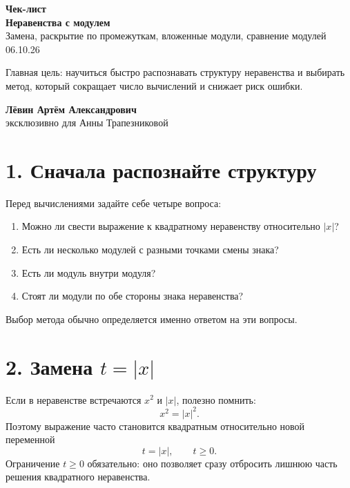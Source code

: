 \documentclass[a4paper,12pt]{article}
\newcommand{\sectionline}{\par\vspace{0.25em}{\color{accent}\hrule height 0.7pt}\vspace{0.7em}}
\begin{document}
\begin{titlepage}
\thispagestyle{empty}
\centering
\vspace*{26mm}
{\Large\color{darkaccent}\textbf{Чек-лист}}\\[8mm]
{\Huge\bfseries Неравенства с модулем}\\[5mm]
{\large Замена, раскрытие по промежуткам, вложенные модули, сравнение модулей}\\[18mm]
{\large 06.10.26}\\[24mm]
\begin{minipage}{0.78\textwidth}
\centering
\large
Главная цель: научиться быстро распознавать структуру неравенства и выбирать метод, который сокращает число вычислений и снижает риск ошибки.
\end{minipage}
\vfill
{\large\textbf{Лёвин Артём Александрович}}\\[2mm]
{\large эксклюзивно для Анны Трапезниковой}
\vspace{15mm}

\end{titlepage}

\section*{1. Сначала распознайте структуру}
\sectionline
Перед вычислениями задайте себе четыре вопроса:
\begin{enumerate}
  \item Можно ли свести выражение к квадратному неравенству относительно $|x|$?
  \item Есть ли несколько модулей с разными точками смены знака?
  \item Есть ли модуль внутри модуля?
  \item Стоят ли модули по обе стороны знака неравенства?
\end{enumerate}

Выбор метода обычно определяется именно ответом на эти вопросы.

\section*{2. Замена $t=|x|$}
\sectionline
Если в неравенстве встречаются $x^2$ и $|x|$, полезно помнить:
\[
 x^2=|x|^2.
\]
Поэтому выражение часто становится квадратным относительно новой переменной
\[
 t=|x|,\qquad t\ge 0.
\]
Ограничение $t\ge0$ обязательно: оно позволяет сразу отбросить лишнюю часть решения квадратного неравенства.
\end{document}
